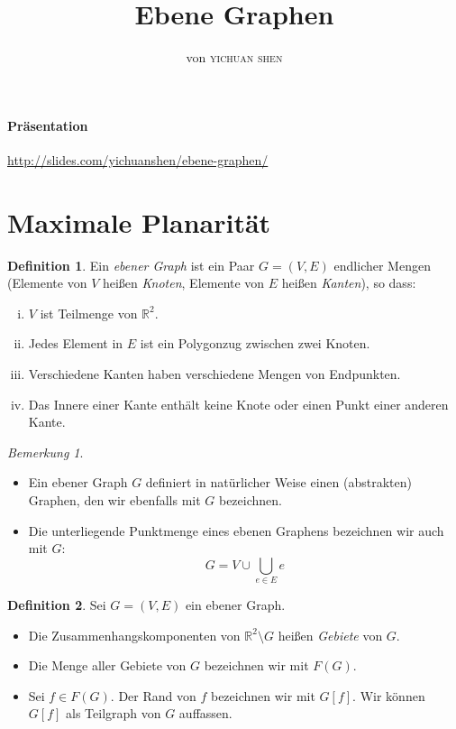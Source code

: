 \documentclass[10pt,b5paper]{article}
\author{von \textsc{yichuan shen}}
\title{Ebene Graphen}
\begin{document}
\theoremstyle{plain}
\theoremstyle{definition}
\newtheorem{theorem}{Theorem}
\newtheorem{lemma}[theorem]{Lemma}
\newtheorem{proposition}[theorem]{Satz}
\newtheorem{corollary}[theorem]{Korollar}
\theoremstyle{definition}
\newtheorem*{definition}{Definition}
\newtheorem*{example}{Beispiel}
\theoremstyle{remark}
\newtheorem*{remark}{Bemerkung}

\maketitle

\paragraph{Präsentation} \url{http://slides.com/yichuanshen/ebene-graphen/}

\section{Maximale Planarität}

\begin{definition}
Ein \textit{ebener Graph} ist ein Paar $G= (V, E)$ endlicher Mengen (Elemente von $V$ heißen \textit{Knoten}, Elemente von $E$ heißen \textit{Kanten}), so dass:
\begin{enumerate}[(i)]
\item $V$ ist Teilmenge von $\mathbb{R}^2$.
\item Jedes Element in $E$ ist ein Polygonzug zwischen zwei Knoten.
\item Verschiedene Kanten haben verschiedene Mengen von Endpunkten.
\item Das Innere einer Kante enthält keine Knote oder einen Punkt einer anderen Kante.
\end{enumerate}
\end{definition}

\begin{remark}
\begin{itemize}
\item  Ein ebener Graph $G$ definiert in natürlicher Weise einen (abstrakten) Graphen, den wir ebenfalls mit $G$ bezeichnen.
\item Die unterliegende Punktmenge eines ebenen Graphens bezeichnen wir auch mit $G$:
\[ G = V \cup\bigcup_{e\in E}e \]
\end{itemize}
\end{remark}

\begin{definition}
Sei $G = (V, E)$ ein ebener Graph. 
\begin{itemize}
\item Die Zusammenhangskomponenten von $\mathbb{R}^2\setminus G$ heißen \textit{Gebiete} von $G$. 
\item Die Menge aller Gebiete von $G$ bezeichnen wir mit $F(G)$.
\item Sei $f\in F(G)$. Der Rand von $f$ bezeichnen wir mit $G[f]$. Wir können $G[f]$ als Teilgraph von $G$ auffassen.
\end{itemize}
\end{definition}
\end{document}
